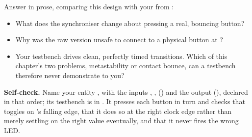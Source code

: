  Answer in prose, comparing this design with your  from :
\begin{itemize}
  \item What does the synchroniser change about pressing a real, bouncing button?
  \item Why was the raw version unsafe to connect to a physical button at ?
  \item Your testbench drives clean, perfectly timed transitions. Which of this chapter's two
    problems, metastability or contact bounce, can a testbench therefore never demonstrate to you?
\end{itemize}


\begin{selfcheck}
\textbf{Self-check.} Name your entity , with the inputs ,
,  () and the output 
(), declared in that order; its testbench is in
. It presses each button in turn and checks that 
toggles on 's falling edge, that it does so at the right clock edge rather than
merely settling on the right value eventually, and that it never fires the wrong LED.
\end{selfcheck}
